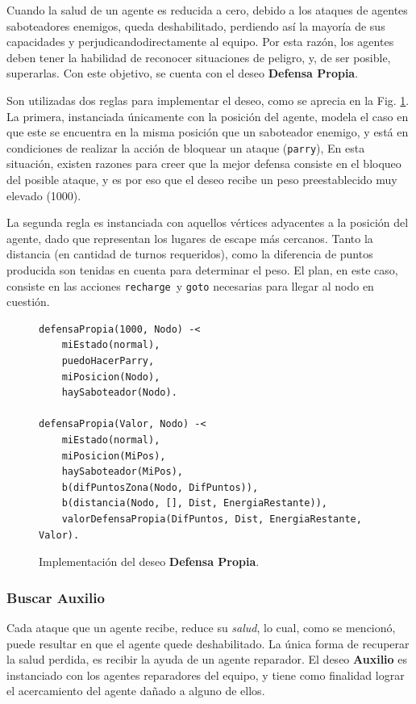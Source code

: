 \documentclass[oneside]{book}
\theoremstyle{definition}
\theoremstyle{example}
\begin{document}
Cuando la salud de un agente es reducida a cero, debido a los ataques de 
agentes saboteadores enemigos, queda deshabilitado, perdiendo así la mayoría 
de sus capacidades y perjudicandodirectamente al equipo. Por esta razón, los 
agentes deben tener la habilidad de reconocer situaciones de peligro, y, de 
ser posible, superarlas. Con este objetivo, se cuenta con el deseo 
\textbf{Defensa Propia}.

Son utilizadas dos reglas para implementar el deseo, como se aprecia en la Fig. 
\ref{fig:deseoDefensaPropia}.
La primera, instanciada únicamente con la posición del agente, modela el caso en que este se 
encuentra en la misma posición que un saboteador enemigo, y está en condiciones de realizar 
la acción de bloquear un ataque (\texttt{parry}), En esta situación, existen razones para 
creer que la mejor defensa consiste en el bloqueo del posible ataque, y es por eso que el 
deseo recibe un peso preestablecido muy elevado (1000). 

La segunda regla es instanciada con aquellos vértices adyacentes a la posición del agente,
dado que representan los lugares de escape más cercanos. Tanto la distancia (en cantidad de 
turnos requeridos), como la diferencia de puntos producida son tenidas en cuenta para 
determinar el peso. El plan, en este caso, consiste en las acciones \texttt{recharge}\ y 
\texttt{goto} necesarias para llegar al nodo en cuestión.

\begin{figure}
\begin{verbatim}
defensaPropia(1000, Nodo) -<
    miEstado(normal),    
    puedoHacerParry,
    miPosicion(Nodo),
    haySaboteador(Nodo).

defensaPropia(Valor, Nodo) -<
    miEstado(normal),    
    miPosicion(MiPos),    
    haySaboteador(MiPos),
    b(difPuntosZona(Nodo, DifPuntos)),
    b(distancia(Nodo, [], Dist, EnergiaRestante)),
    valorDefensaPropia(DifPuntos, Dist, EnergiaRestante, Valor).
\end{verbatim}
\caption{Implementación del deseo \textbf{Defensa Propia}.}
\label{fig:deseoDefensaPropia}
\end{figure}
	
\subsubsection{Buscar Auxilio}
	
Cada ataque que un agente recibe, reduce su \textit{salud}, lo cual, como se mencionó, 
puede resultar en que el agente quede deshabilitado. La única forma de recuperar la 
salud perdida, es recibir la ayuda de un agente reparador. El deseo \textbf{Auxilio} 
es instanciado con los agentes reparadores del equipo, y tiene como finalidad lograr 
el acercamiento del agente dañado a alguno de ellos.
\end{document}
